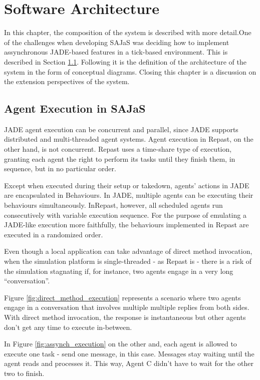 \chapter{Software Architecture}
\label{chap:architecture}

In this chapter, the composition of the system is described with more detail.One of the challenges when developing SAJaS was deciding how to implement assynchronous JADE-based features in a tick-based environment. This is described in Section \ref{sec:agentexecution}. Following it is the definition of the architecture of the system in the form of conceptual diagrams. Closing this chapter is a discussion on the extension perspectives of the system.

\section{Agent Execution in SAJaS}
\label{sec:agentexecution}

JADE agent execution can be concurrent and parallel, since JADE supports distributed and multi-threaded agent systems. Agent execution in Repast, on the other hand, is not concurrent. Repast uses a time-share type of execution, granting each agent the right to perform its tasks until they finish them, in sequence, but in no particular order.

Except when executed during their setup or takedown, agents' actions in JADE are encapsulated in Behaviours. In JADE, multiple agents can be executing their behaviours simultaneously. InRepast, however, all scheduled agents run consecutively with variable execution sequence. For the purpose of emulating a JADE-like execution more faithfully, the behaviours implemented in Repast are executed in a randomized order.

Even though a local application can take advantage of direct method invocation, when the simulation platform is single-threaded - as Repast is - there is a risk of the simulation stagnating if, for instance, two agents engage in a very long ``conversation''.

Figure \ref{fig:direct_method_execution} represents a scenario where two agents engage in a conversation that involves multiple multiple replies from both sides. With direct method invocation, the response is instantaneous but other agents don't get any time to execute in-between.

In Figure \ref{fig:assynch_execution} on the other and, each agent is allowed to execute one task - send one message, in this case. Messages stay waiting until the agent reads and processes it. This way, Agent C didn't have to wait  for the other two to finish.

